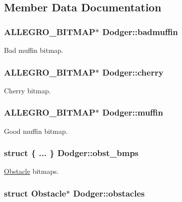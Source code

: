 \subsection{Member Data Documentation}
\hypertarget{structDodger_a10d42f3b0807e8d538e23d459de7cddc}{
\subsubsection[{badmuffin}]{\setlength{\rightskip}{0pt plus 5cm}A\-L\-L\-E\-G\-R\-O\-\_\-\-B\-I\-T\-M\-A\-P$\ast$ Dodger\-::badmuffin}}\label{structDodger_a10d42f3b0807e8d538e23d459de7cddc}
Bad muffin bitmap. \hypertarget{structDodger_a374d77e3c665e735db2c92f457d80273}{
\subsubsection[{cherry}]{\setlength{\rightskip}{0pt plus 5cm}A\-L\-L\-E\-G\-R\-O\-\_\-\-B\-I\-T\-M\-A\-P$\ast$ Dodger\-::cherry}}\label{structDodger_a374d77e3c665e735db2c92f457d80273}
Cherry bitmap. \hypertarget{structDodger_a9848452f9b8886eaeb49824abd98cfa2}{
\subsubsection[{muffin}]{\setlength{\rightskip}{0pt plus 5cm}A\-L\-L\-E\-G\-R\-O\-\_\-\-B\-I\-T\-M\-A\-P$\ast$ Dodger\-::muffin}}\label{structDodger_a9848452f9b8886eaeb49824abd98cfa2}
Good muffin bitmap. \hypertarget{structDodger_abbf5585478c85e05e1c60258de290507}{
\subsubsection[{obst\-\_\-bmps}]{\setlength{\rightskip}{0pt plus 5cm}struct \{ ... \}   Dodger\-::obst\-\_\-bmps}}\label{structDodger_abbf5585478c85e05e1c60258de290507}
\hyperlink{structObstacle}{Obstacle} bitmaps. \hypertarget{structDodger_a114a5a2b5b3640ce2bd7b5a9f7486dfc}{
\subsubsection[{obstacles}]{\setlength{\rightskip}{0pt plus 5cm}struct {\bf Obstacle}$\ast$ Dodger\-::obstacles}}\label{structDodger_a114a5a2b5b3640ce2bd7b5a9f7486dfc}
